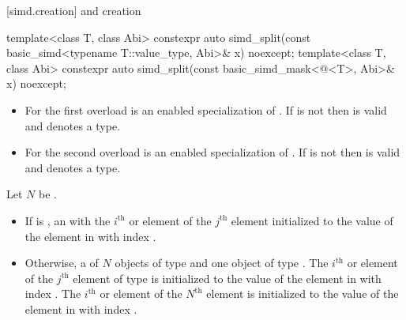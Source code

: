 [simd.creation]{ and  creation}

\begin{itemdecl}
template<class T, class Abi>
  constexpr auto simd_split(const basic_simd<typename T::value_type, Abi>& x) noexcept;
template<class T, class Abi>
  constexpr auto simd_split(const basic_simd_mask<@\maskelementsize@<T>, Abi>& x) noexcept;
\end{itemdecl}

\begin{itemdescr}

  \pnum\constraints
  \begin{itemize}
    \item For the first overload  is an enabled specialization of . If
       is
      not  then  is valid and denotes a type.

    \item For the second overload  is an enabled specialization of .
      If  is not
       then  is valid and denotes a type.
  \end{itemize}

  \pnum Let $N$ be .

    \pnum\returns
    \begin{itemize}
      \item If  is , an  with
        the $i^\text{th}$ \simd or \mask element of the $j^\text{th}$ 
        element initialized to the value of the element in  with index
        .

      \item Otherwise, a  of $N$ objects of type  and one
        object of type .
        The $i^\text{th}$ \simd or \mask element of the $j^\text{th}$
         element of type  is initialized to the value of
        the element in  with index .
        The $i^\text{th}$ \simd or \mask element of the $N^\text{th}$
         element is initialized to the value of the element in
         with index .
    \end{itemize}
  \end{itemdescr}


